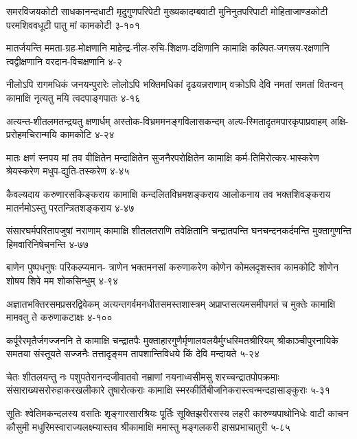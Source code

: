 \annofourlineindentedshloka
{समरविजयकोटी साधकानन्दधाटी}
{मृदुगुणपरिपेटी मुख्यकादम्बवाटी}
{मुनिनुतपरिपाटी मोहिताजाण्डकोटी}
{परमशिववधूटी पातु मां कामकोटी}
{३-१०१}




\annofourlineindentedshloka
{मातर्जयन्ति ममता-ग्रह-मोक्षणानि}
{माहेन्द्र-नील-रुचि-शिक्षण-दक्षिणानि}
{कामाक्षि कल्पित-जगत्त्रय-रक्षणानि}
{त्वद्वीक्षणानि वरदान-विचक्षणानि}
{४-२}

\annofourlineindentedshloka
{नीलोऽपि रागमधिकं जनयन्पुरारेः}
{लोलोऽपि भक्तिमधिकां दृढयन्नराणाम्}
{वक्रोऽपि देवि नमतां समतां वितन्वन्}
{कामाक्षि नृत्यतु मयि त्वदपाङ्गपातः}
{४-१६}

\annofourlineindentedshloka
{अत्यन्त-शीतलमतन्द्रयतु क्षणार्धम्}
{अस्तोक-विभ्रममनङ्गविलासकन्दम्}
{अल्प-स्मितादृतमपारकृपाप्रवाहम्}
{अक्षि-प्ररोहमचिरान्मयि कामकोटि}
{४-२४}

\annofourlineindentedshloka
{मातः क्षणं स्नपय मां तव वीक्षितेन}
{मन्दाक्षितेन सुजनैरपरोक्षितेन}
{कामाक्षि कर्म-तिमिरोत्कर-भास्करेण}
{श्रेयस्करेण मधुप-द्युति-तस्करेण}
{४-४५}

\annofourlineindentedshloka
{कैवल्यदाय करुणारसकिङ्कराय}
{कामाक्षि कन्दलितविभ्रमशङ्कराय}
{आलोकनाय तव भक्तशिवङ्कराय}
{मातर्नमोऽस्तु परतन्त्रितशङ्कराय}
{४-४७}

\annofourlineindentedshloka
{संसारघर्मपरितापजुषां नराणाम्}
{कामाक्षि शीतलतराणि तवेक्षितानि}
{चन्द्रातपन्ति घनचन्दनकर्दमन्ति}
{मुक्तागुणन्ति हिमवारिनिषेचनन्ति}
{४-७७}

\annofourlineindentedshloka
{बाणेन पुष्पधनुषः परिकल्प्यमान-}
{त्राणेन भक्तमनसां करुणाकरेण}
{कोणेन कोमलदृशस्तव कामकोटि}
{शोणेन शोषय शिवे मम शोकसिन्धुम्}
{४-९४}

\annofourlineindentedshloka
{अज्ञातभक्तिरसमप्रसरद्विवेकम्}
{अत्यन्तगर्वमनधीतसमस्तशास्त्रम्}
{अप्राप्तसत्यमसमीपगतं च मुक्तेः}
{कामाक्षि मामवतु ते करुणाकटाक्षः}
{४-१००}%



\annofourlineindentedshloka
{कर्पूरैरमृतैर्जगज्जननि ते कामाक्षि चन्द्रातपैः}
{मुक्ताहारगुणैर्मृणालवलयैर्मुग्धस्मितश्रीरियम्}
{श्रीकाञ्चीपुरनायिके समतया संस्तूयते सज्जनैः}
{तत्तादृङ्मम तापशान्तिविधये किं देवि मन्दायते}
{५-२४}

\annofourlineindentedshloka
{चेतः शीतलयन्तु नः पशुपतेरानन्दजीवातवो}
{नम्राणां नयनाध्वसीमसु शरच्चन्द्रातपोपक्रमाः}
{संसाराख्यसरोरुहाकरखलीकारे तुषारोत्कराः}
{कामाक्षि स्मरकीर्तिबीजनिकरास्त्वन्मन्दहासाङ्कुराः}
{५-३१}

\annofourlineindentedshloka
{सूतिः श्वेतिमकन्दलस्य वसतिः शृङ्गारसारश्रियः}
{पूर्तिः सूक्तिझरीरसस्य लहरी कारुण्यपाथोनिधेः}
{वाटी काचन कौसुमी मधुरिमस्वाराज्यलक्ष्म्यास्तव}
{श्रीकामाक्षि ममास्तु मङ्गलकरी हासप्रभाचातुरी}
{५-८५}


